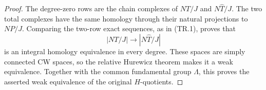 \begin{proof}
The degree-zero rows are the chain complexes of $NT/J$ and
$N\widehat T/J$. The two total complexes have the same
homology through their natural projections to $NP/J$.
Comparing the two-row exact sequences, as in (TR.1), proves
that
\[
 |NT/J|\longrightarrow |N\widehat T/J|
\]
is an integral homology equivalence in every degree. These
spaces are simply connected CW spaces, so the relative
Hurewicz theorem makes it a weak equivalence. Together with
the common fundamental group $\Lambda$, this proves the
asserted weak equivalence of the original $H$-quotients.
\end{proof}
